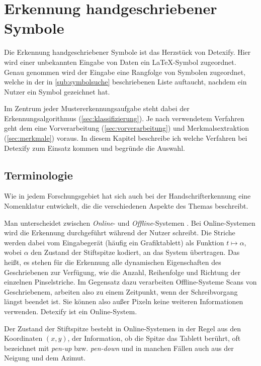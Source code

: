 

\chapter{Erkennung handgeschriebener Symbole} 

\label{cha:erkennung_handgeschriebener_symbole}

Die Erkennung handgeschriebener Symbole ist das Herzstück von Detexify. Hier wird einer unbekannten Eingabe von Daten ein \LaTeX-Symbol zugeordnet. Genau genommen wird der Eingabe eine Rangfolge von Symbolen zugeordnet, welche in der in \ref{sub:symbolsuche} beschriebenen Liste auftaucht, nachdem ein Nutzer ein Symbol gezeichnet hat.

Im Zentrum jeder Mustererkennungsaufgabe steht dabei der Erkennungsalgorithmus (\ref{sec:klassifizierung}). Je nach verwendetem Verfahren geht dem eine Vorverarbeitung (\ref{sec:vorverarbeitung}) und Merkmalsextraktion (\ref{sec:merkmale}) voraus. In diesem Kapitel beschreibe ich welche Verfahren bei Detexify zum Einsatz kommen und begründe die Auswahl.

\section{Terminologie} 

\label{sec:terminologie}

Wie in jedem Forschungsgebiet hat sich auch bei der Handschrifterkennung eine Nomenklatur entwickelt, die die verschiedenen Aspekte des Themas beschreibt.

Man unterscheidet zwischen \emph{Online}- und \emph{Offline}-Systemen \cite{Tappert:1990p10302}. Bei Online-Systemen wird die Erkennung durchgeführt während der Nutzer schreibt. Die Striche werden dabei vom Eingabegerät (häufig ein Grafiktablett) als Funktion \( t \mapsto \alpha \), wobei \( \alpha \) den Zustand der Stiftspitze kodiert, an das System übertragen. Das heißt, es stehen für die Erkennung alle dynamischen Eigenschaften des Geschriebenen zur Verfügung, wie die Anzahl, Reihenfolge und Richtung der einzelnen Pinselstriche. Im Gegensatz dazu verarbeiten Offline-Systeme Scans von Geschriebenem, arbeiten also zu einem Zeitpunkt, wenn der Schreibvorgang längst beendet ist. Sie können also außer Pixeln keine weiteren Informationen verwenden. Detexify ist ein Online-System.

Der Zustand der Stiftspitze besteht in Online-Systemen in der Regel aus den Koordinaten $(x,y)$, der Information, ob die Spitze das Tablett berührt, oft bezeichnet mit \emph{pen-up} bzw. \emph{pen-down} und in manchen Fällen auch aus der Neigung und dem Azimut.

